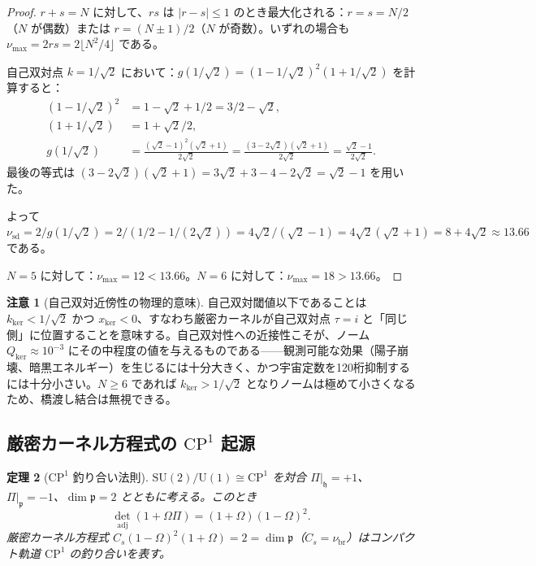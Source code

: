 \documentclass[12pt]{article}
\theoremstyle{plain}
\newtheorem{theorem}{定理}[section]
\theoremstyle{definition}
\newtheorem{remark}[theorem]{注意}
\numberwithin{equation}{section}
\newcommand{\fh}{\mathfrak{h}}
\newcommand{\fp}{\mathfrak{p}}
\newcommand{\br}{\mathrm{br}}
\newcommand{\kker}{\mathrm{ker}}
\begin{document}
\begin{proof}
$r+s=N$ に対して、$rs$ は $|r-s|\leq 1$ のとき最大化される：$r=s=N/2$（$N$ が偶数）または $r=(N\pm 1)/2$（$N$ が奇数）。いずれの場合も $\nu_{\max}=2rs=2\lfloor N^2/4\rfloor$ である。

自己双対点 $k=1/\sqrt{2}$ において：$g(1/\sqrt{2})=(1-1/\sqrt{2})^2(1+1/\sqrt{2})$ を計算すると：
\begin{align}
(1-1/\sqrt{2})^2 &= 1-\sqrt{2}+1/2 = 3/2-\sqrt{2},\\
(1+1/\sqrt{2}) &= 1+\sqrt{2}/2,\\
g(1/\sqrt{2}) &= \frac{(\sqrt{2}-1)^2(\sqrt{2}+1)}{2\sqrt{2}} = \frac{(3-2\sqrt{2})(\sqrt{2}+1)}{2\sqrt{2}} = \frac{\sqrt{2}-1}{2\sqrt{2}}.
\end{align}
最後の等式は $(3-2\sqrt{2})(\sqrt{2}+1)=3\sqrt{2}+3-4-2\sqrt{2}=\sqrt{2}-1$ を用いた。

よって $\nu_{\mathrm{sd}}=2/g(1/\sqrt{2})=2/(1/2-1/(2\sqrt{2}))=4\sqrt{2}/(\sqrt{2}-1)=4\sqrt{2}(\sqrt{2}+1)=8+4\sqrt{2}\approx 13.66$ である。

$N=5$ に対して：$\nu_{\max}=12<13.66$。$N=6$ に対して：$\nu_{\max}=18>13.66$。
\end{proof}

\begin{remark}[自己双対近傍性の物理的意味]
自己双対閾値以下であることは $k_{\kker}<1/\sqrt{2}$ かつ $x_{\kker}<0$、すなわち厳密カーネルが自己双対点 $\tau=i$ と「同じ側」に位置することを意味する。自己双対性への近接性こそが、ノーム $Q_{\kker}\approx 10^{-3}$ にその中程度の値を与えるものである——観測可能な効果（陽子崩壊、暗黒エネルギー）を生じるには十分大きく、かつ宇宙定数を120桁抑制するには十分小さい。$N\geq 6$ であれば $k_{\kker}>1/\sqrt{2}$ となりノームは極めて小さくなるため、橋渡し結合は無視できる。
\end{remark}

\subsection{厳密カーネル方程式の $\mathrm{CP}^1$ 起源}

\begin{theorem}[$\mathrm{CP}^1$ 釣り合い法則]\label{thm:CP1}
$\mathrm{SU}(2)/\mathrm{U}(1)\cong\mathrm{CP}^1$ を対合 $\Pi|_\fh=+1$、$\Pi|_\fp=-1$、$\dim\fp=2$ とともに考える。このとき
\begin{equation}
\det_{\mathrm{adj}}(1+\Omega\Pi) = (1+\Omega)(1-\Omega)^2.
\end{equation}
厳密カーネル方程式 $C_s(1-\Omega)^2(1+\Omega)=2=\dim\fp$（$C_s=\nu_{\br}$）はコンパクト軌道 $\mathrm{CP}^1$ の釣り合いを表す。
\end{theorem}
\end{document}
